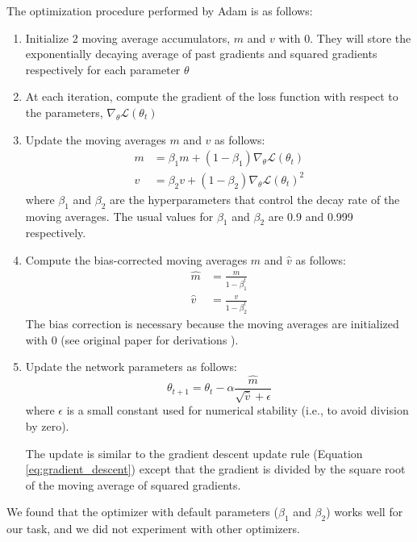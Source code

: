 \documentclass[a4paper, twoside]{report}
\theoremstyle{definition}
\numberwithin{equation}{section}
\begin{document}
The optimization procedure performed by Adam is as follows:
\begin{enumerate}
    \item Initialize 2 moving average accumulators, $m$ and $v$ with 0.
          They will store the exponentially decaying average of past gradients
          and squared gradients respectively for each parameter $\theta$
    \item At each iteration, compute the gradient of the loss function with
          respect to the parameters, $\nabla_{\theta} \mathcal{L}(\theta_t)$
    \item Update the moving averages $m$ and $v$ as follows:
          \begin{align*}
              m & = \beta_1 m + (1 - \beta_1) \nabla_{\theta} \mathcal{L}(\theta_t)   \\
              v & = \beta_2 v + (1 - \beta_2) \nabla_{\theta} \mathcal{L}(\theta_t)^2
          \end{align*}
          where $\beta_1$ and $\beta_2$ are the hyperparameters that control the decay rate of the moving averages.
          The usual values for $\beta_1$ and $\beta_2$ are 0.9 and 0.999 respectively.
    \item Compute the bias-corrected moving averages $\hat{m}$ and $\hat{v}$ as follows:
          \begin{align*}
              \hat{m} & = \frac{m}{1 - \beta_1^t} \\
              \hat{v} & = \frac{v}{1 - \beta_2^t}
          \end{align*}
          The bias correction is necessary because the moving averages are initialized with 0
          (see original paper for derivations \cite{Kingma2014AdamAM}).
    \item Update the network parameters as follows:
          \begin{equation*}
              \theta_{t+1}=\theta_t - \alpha \frac{\hat{m}}{\sqrt{\hat{v}} + \epsilon}
          \end{equation*}
          where $\epsilon$ is a small constant used for numerical stability
          (i.e., to avoid division by zero).

          The update is similar to the gradient descent update rule (Equation \ref{eq:gradient_descent})
          except that the gradient is divided by the square root of the moving average of squared gradients.
\end{enumerate}

We found that the optimizer with default parameters ($\beta_1$ and $\beta_2$) works well for our task, and we did not experiment
with other optimizers.
\end{document}
